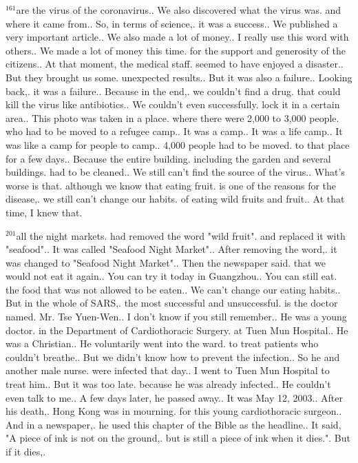 \documentclass{book}
\begin{document}
$^{161}$are the virus of the coronavirus..
We also discovered what the virus was.
and where it came from..
So, in terms of science,.
it was a success..
We published a very important article..
We also made a lot of money..
I really use this word with others..
We made a lot of money this time.
for the support and generosity of the citizens..
At that moment, the medical staff.
seemed to have enjoyed a disaster..
But they brought us some.
unexpected results..
But it was also a failure..
Looking back,.
it was a failure..
Because in the end,.
we couldn't find a drug.
that could kill the virus like antibiotics..
We couldn't even successfully.
lock it in a certain area..
This photo was taken in a place.
where there were 2,000 to 3,000 people.
who had to be moved to a refugee camp..
It was a camp..
It was a life camp..
It was like a camp for people to camp..
4,000 people had to be moved.
to that place for a few days..
Because the entire building.
including the garden and several buildings.
had to be cleaned..
We still can't find the source of the virus..
What's worse is that.
although we know that eating fruit.
is one of the reasons for the disease,.
we still can't change our habits.
of eating wild fruits and fruit..
At that time, I knew that.

$^{201}$all the night markets.
had removed the word "wild fruit".
and replaced it with "seafood"..
It was called "Seafood Night Market"..
After removing the word,.
it was changed to "Seafood Night Market"..
Then the newspaper said.
that we would not eat it again..
You can try it today in Guangzhou..
You can still eat.
the food that was not allowed to be eaten..
We can't change our eating habits..
But in the whole of SARS,.
the most successful and unsuccessful.
is the doctor named.
Mr. Tse Yuen-Wen..
I don't know if you still remember..
He was a young doctor.
in the Department of Cardiothoracic Surgery.
at Tuen Mun Hospital..
He was a Christian..
He voluntarily went into the ward.
to treat patients who couldn't breathe..
But we didn't know how to prevent the infection..
So he and another male nurse.
were infected that day..
I went to Tuen Mun Hospital to treat him..
But it was too late.
because he was already infected..
He couldn't even talk to me..
A few days later, he passed away..
It was May 12, 2003..
After his death,.
Hong Kong was in mourning.
for this young cardiothoracic surgeon..
And in a newspaper,.
he used this chapter of the Bible as the headline..
It said, "A piece of ink is not on the ground,.
but is still a piece of ink when it dies.".
But if it dies,.
\end{document}
